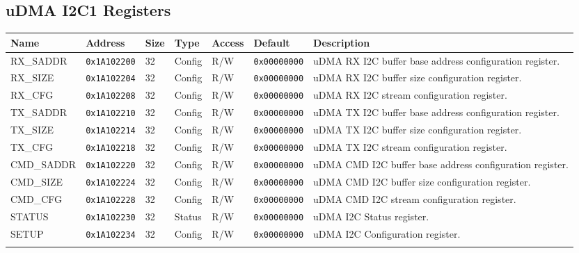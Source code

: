 
\subsection{uDMA I2C1 Registers}
{\small
\begin{tabularx}{\textwidth}{|l|l|l|l|l|l|X|}
  \hline
  \textbf{Name} & \textbf{Address}  & \textbf{Size} & \textbf{Type} & \textbf{Access} & \textbf{Default} & \textbf{Description} \\
  \hline
  RX\_SADDR & \texttt{0x1A102200} & 32 & Config & R/W & \texttt{0x00000000} & uDMA RX I2C buffer base address configuration register.\\
  \hline
  RX\_SIZE & \texttt{0x1A102204} & 32 & Config & R/W & \texttt{0x00000000} & uDMA RX I2C buffer size configuration register.\\
  \hline
  RX\_CFG & \texttt{0x1A102208} & 32 & Config & R/W & \texttt{0x00000000} & uDMA RX I2C stream configuration register.\\
  \hline
  TX\_SADDR & \texttt{0x1A102210} & 32 & Config & R/W & \texttt{0x00000000} & uDMA TX I2C buffer base address configuration register.\\
  \hline
  TX\_SIZE & \texttt{0x1A102214} & 32 & Config & R/W & \texttt{0x00000000} & uDMA TX I2C buffer size configuration register.\\
  \hline
  TX\_CFG & \texttt{0x1A102218} & 32 & Config & R/W & \texttt{0x00000000} & uDMA TX I2C stream configuration register.\\
  \hline
  CMD\_SADDR & \texttt{0x1A102220} & 32 & Config & R/W & \texttt{0x00000000} & uDMA CMD I2C buffer base address configuration register.\\
  \hline
  CMD\_SIZE & \texttt{0x1A102224} & 32 & Config & R/W & \texttt{0x00000000} & uDMA CMD I2C buffer size configuration register.\\
  \hline
  CMD\_CFG & \texttt{0x1A102228} & 32 & Config & R/W & \texttt{0x00000000} & uDMA CMD I2C stream configuration register.\\
  \hline
  STATUS & \texttt{0x1A102230} & 32 & Status & R/W & \texttt{0x00000000} & uDMA I2C Status register.\\
  \hline
  SETUP & \texttt{0x1A102234} & 32 & Config & R/W & \texttt{0x00000000} & uDMA I2C Configuration register.\\
  \hline
  \caption{uDMA I2C1}
\end{tabularx}
}




